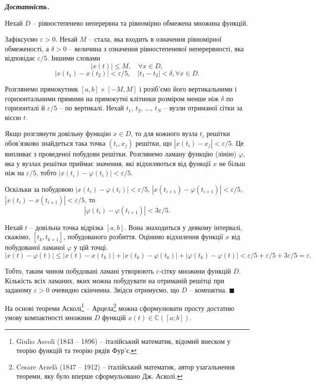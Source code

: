 \documentclass[14pt,twoside]{extreport}
\theoremstyle{mystyle}
\renewenvironment{proof}{{\bfseries Доведення.}}{$\blacksquare$}
\numberwithin{equation}{chapter}
\newcommand{\cab}{\mathbb{C}([a; b])}
\begin{document}
\begin{proof}
\emph{\textbf{Достатність.}}

Нехай $D$ -- рівностепенево неперервна та рівномірно обмежена множина функцій.

Зафіксуємо $\varepsilon>0$. Нехай $M$ -- стала, яка входить в означення рівномірної обмеженості, а $\delta>0$ -- величина з означення рівностепеневої неперервності, яка відповідає $\varepsilon/5$. Іншими словами
\[|x(t)|\leqslant M, \quad \forall x\in D,\]
\[|x(t_1)-x(t_2)|<\varepsilon/5, \quad |t_1-t_2|<\delta,\forall x\in D.\]

Розглянемо прямокутник $[a,b]\times[-M,M]$ і розіб'ємо його вертикальними і горизонтальними прямими на прямокутні клітинки розміром менше ніж $\delta$ по горизонталі й $\varepsilon/5$ -- по вертикалі. Нехай $t_1$, $t_2$, $\ldots$, $t_N$ -- вузли отриманої сітки за віссю $t$.

Якщо розглянути довільну функцію $x\in D$, то для кожного вузла $t_i$ решітки обов'язково знайдеться така точка $(t_i, x_j)$ решітки, що $|x(t_i)-x_j|<\varepsilon/5$. Це випливає з проведеної побудови решітки. Розглянемо ламану функцію (лінію) $\varphi$, яка у вузлах решітки приймає значення, які відхиляються від функції $x$ не більш ніж на $\varepsilon/5$, тобто
$|x(t_i)-\varphi(t_i)|<\varepsilon/5$.

Оскільки за побудовою $|x(t_i)-\varphi(t_i)|<\varepsilon/5$, $|x(t_{i+1}) - \varphi(t_{i+1})|<\varepsilon/5$, $|x(t_i)-x(t_{i+1})|<\varepsilon/5$, то
\[|\varphi(t_{i})-\varphi(t_{i+1})|<3\varepsilon/5.\]

Нехай $t$ -- довільна точка відрізка $[a,b]$. Вона знаходиться у деякому інтервалі, скажімо, $[t_k, t_{k+1}]$, побудованого розбиття. Оцінимо відхилення функції $x$ від побудованої ламаної $\varphi$ у цій точці.
\[|x(t)-\varphi(t)|\leqslant|x(t)-x(t_k)|+|x(t_k)-\varphi(t_k)|+|\varphi(t_k)-\varphi(t)| <\varepsilon/5+\varepsilon/5+3\varepsilon/5=\varepsilon.\]

Тобто, таким чином побудовані ламані утворюють $\varepsilon$-сітку множини функцій $D$. Кількість всіх ламаних, яких можна побудувати на отриманій решітці при заданому $\varepsilon>0$ очевидно скінченна. Звідси отримуємо, що $D$ -- компактна.
\end{proof}

На основі теореми Асколі\footnote{Giulio Ascoli (1843 --  1896) -- італійський математик, відомий внеском у теорію функцій та теорію рядів Фур'є.} -- Арцела\footnote{Cesare Arzel\`{a} (1847 -- 1912) -- італійський математик, автор узагальнення теореми, яку було вперше сформульовано Дж. Асколі.} можна сформулювати просту достатню умову компактності множини $D$ функцій $x(t) \in \cab$.
\end{document}

